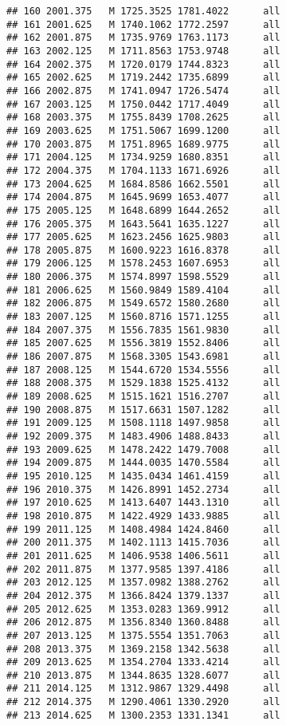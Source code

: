 \documentclass[]{article}
\begin{document}
\begin{verbatim}
## 160 2001.375   M 1725.3525 1781.4022      all
## 161 2001.625   M 1740.1062 1772.2597      all
## 162 2001.875   M 1735.9769 1763.1173      all
## 163 2002.125   M 1711.8563 1753.9748      all
## 164 2002.375   M 1720.0179 1744.8323      all
## 165 2002.625   M 1719.2442 1735.6899      all
## 166 2002.875   M 1741.0947 1726.5474      all
## 167 2003.125   M 1750.0442 1717.4049      all
## 168 2003.375   M 1755.8439 1708.2625      all
## 169 2003.625   M 1751.5067 1699.1200      all
## 170 2003.875   M 1751.8965 1689.9775      all
## 171 2004.125   M 1734.9259 1680.8351      all
## 172 2004.375   M 1704.1133 1671.6926      all
## 173 2004.625   M 1684.8586 1662.5501      all
## 174 2004.875   M 1645.9699 1653.4077      all
## 175 2005.125   M 1648.6899 1644.2652      all
## 176 2005.375   M 1643.5641 1635.1227      all
## 177 2005.625   M 1623.2456 1625.9803      all
## 178 2005.875   M 1600.9223 1616.8378      all
## 179 2006.125   M 1578.2453 1607.6953      all
## 180 2006.375   M 1574.8997 1598.5529      all
## 181 2006.625   M 1560.9849 1589.4104      all
## 182 2006.875   M 1549.6572 1580.2680      all
## 183 2007.125   M 1560.8716 1571.1255      all
## 184 2007.375   M 1556.7835 1561.9830      all
## 185 2007.625   M 1556.3819 1552.8406      all
## 186 2007.875   M 1568.3305 1543.6981      all
## 187 2008.125   M 1544.6720 1534.5556      all
## 188 2008.375   M 1529.1838 1525.4132      all
## 189 2008.625   M 1515.1621 1516.2707      all
## 190 2008.875   M 1517.6631 1507.1282      all
## 191 2009.125   M 1508.1118 1497.9858      all
## 192 2009.375   M 1483.4906 1488.8433      all
## 193 2009.625   M 1478.2422 1479.7008      all
## 194 2009.875   M 1444.0035 1470.5584      all
## 195 2010.125   M 1435.0434 1461.4159      all
## 196 2010.375   M 1426.8991 1452.2734      all
## 197 2010.625   M 1413.6407 1443.1310      all
## 198 2010.875   M 1422.4929 1433.9885      all
## 199 2011.125   M 1408.4984 1424.8460      all
## 200 2011.375   M 1402.1113 1415.7036      all
## 201 2011.625   M 1406.9538 1406.5611      all
## 202 2011.875   M 1377.9585 1397.4186      all
## 203 2012.125   M 1357.0982 1388.2762      all
## 204 2012.375   M 1366.8424 1379.1337      all
## 205 2012.625   M 1353.0283 1369.9912      all
## 206 2012.875   M 1356.8340 1360.8488      all
## 207 2013.125   M 1375.5554 1351.7063      all
## 208 2013.375   M 1369.2158 1342.5638      all
## 209 2013.625   M 1354.2704 1333.4214      all
## 210 2013.875   M 1344.8635 1328.6077      all
## 211 2014.125   M 1312.9867 1329.4498      all
## 212 2014.375   M 1290.4061 1330.2920      all
## 213 2014.625   M 1300.2353 1331.1341      all

\end{verbatim}
\end{document}
